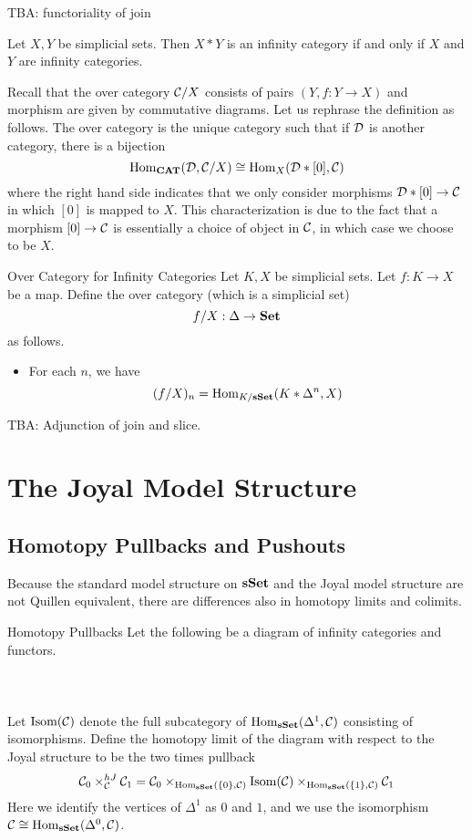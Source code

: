 \documentclass[a4paper]{article}
\begin{document}
TBA: functoriality of join

\begin{prp}{}{} Let $X,Y$ be simplicial sets. Then $X\ast Y$ is an infinity category if and only if $X$ and $Y$ are infinity categories. 
\end{prp}

Recall that the over category $\mathcal{C}/X$ consists of pairs $(Y,f:Y\to X)$ and morphism are given by commutative diagrams. Let us rephrase the definition as follows. The over category is the unique category such that if $\mathcal{D}$ is another category, there is a bijection $$\operatorname{Hom}_\bold{CAT}(\mathcal{D},\mathcal{C}/X)\cong\operatorname{Hom}_X(\mathcal{D}\ast[0],\mathcal{C})$$ where the right hand side indicates that we only consider morphisms $\mathcal{D}\ast[0]\to\mathcal{C}$ in which $[0]$ is mapped to $X$. This characterization is due to the fact that a morphism $[0]\to\mathcal{C}$ is essentially a choice of object in $\mathcal{C}$, in which case we choose to be $X$. 

\begin{defn}{Over Category for Infinity Categories}{} Let $K,X$ be simplicial sets. Let $f:K\to X$ be a map. Define the over category (which is a simplicial set) $$f/X:\Delta\to\bold{Set}$$ as follows. 
\begin{itemize}
\item For each $n$, we have $$(f/X)_n=\operatorname{Hom}_{K/\bold{sSet}}(K\ast\Delta^n,X)$$
\end{itemize}
\end{defn}

TBA: Adjunction of join and slice. 

\pagebreak
\section{The Joyal Model Structure}

\subsection{Homotopy Pullbacks and Pushouts}
Because the standard model structure on $\bold{sSet}$ and the Joyal model structure are not Quillen equivalent, there are differences also in homotopy limits and colimits. 

\begin{defn}{Homotopy Pullbacks}{} Let the following be a diagram of infinity categories and functors. \\~\\
\\~\\
Let $\text{Isom}(\mathcal{C})$ denote the full subcategory of $\operatorname{Hom}_\bold{sSet}(\Delta^1,\mathcal{C})$ consisting of isomorphisms. Define the homotopy limit of the diagram with respect to the Joyal structure to be the two times pullback $$\mathcal{C}_0\times_{\mathcal{C}}^{hJ}\mathcal{C}_1=\mathcal{C}_0\times_{\operatorname{Hom}_\bold{sSet}(\{0\},\mathcal{C})}\text{Isom}(\mathcal{C})\times_{\operatorname{Hom}_\bold{sSet}(\{1\},\mathcal{C})}\mathcal{C}_1$$ Here we identify the vertices of $\Delta^1$ as $0$ and $1$, and we use the isomorphism $\mathcal{C}\cong\operatorname{Hom}_\bold{sSet}(\Delta^0,\mathcal{C})$. 
\end{defn}
\end{document}
